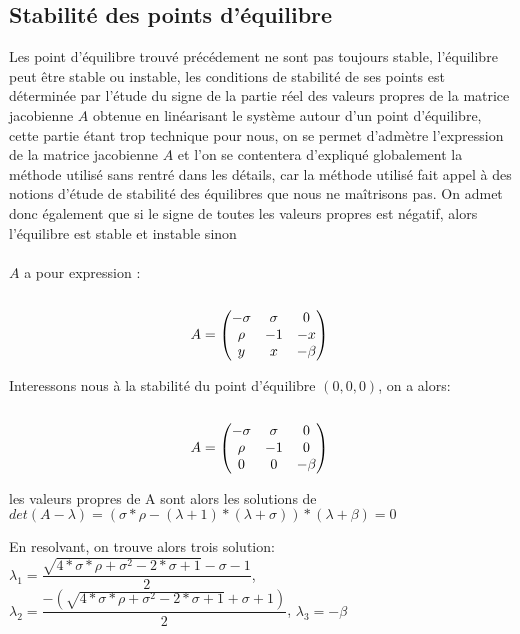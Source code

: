 \subsection{Stabilité des points d'équilibre}
Les point d'équilibre trouvé précédement ne sont pas toujours stable, l'équilibre peut être stable ou instable, les conditions de stabilité de ses points est déterminée par l'étude du signe de la partie réel des valeurs propres de la matrice jacobienne $A$ obtenue en linéarisant le système autour d'un point d'équilibre, cette partie étant trop technique pour nous, on se permet d'admètre l'expression de la matrice jacobienne $A$ et l'on se contentera d'expliqué globalement la méthode utilisé sans rentré dans les détails, car la méthode utilisé fait appel à des notions d'étude de stabilité des équilibres que nous ne maîtrisons pas. On admet donc également que si le signe de toutes les valeurs propres est négatif, alors l'équilibre est stable et instable sinon \\\\ 
$A$ a pour expression :\\\\
$$A=\begin{pmatrix}
    -\sigma & \sigma & 0\\
    \rho & -1 & -x\\
       y & x & -\beta 
\end{pmatrix}\\\\$$

Interessons nous à la stabilité du point d'équilibre $(0,0,0)$, on a alors:\\\\
$$A=\begin{pmatrix}
    -\sigma & \sigma & 0\\
    \rho & -1 & 0\\
       0 & 0 & -\beta 
\end{pmatrix}\\\\$$

les valeurs propres de A sont alors les solutions de
 $det(A-\lambda)=(\sigma*\rho-(\lambda+1)*(\lambda+\sigma))*(\lambda+\beta)=0 $

 En resolvant, on trouve alors trois solution: $\lambda_{1}=\dfrac{\sqrt{4*\sigma*\rho+\sigma^2-2*\sigma+1}-\sigma-1}{2}$, $\lambda_{2}=\dfrac{-(\sqrt{4*\sigma*\rho+\sigma^2-2*\sigma+1}+\sigma+1)}{2}$, $\lambda_{3}=-\beta$\\\\

